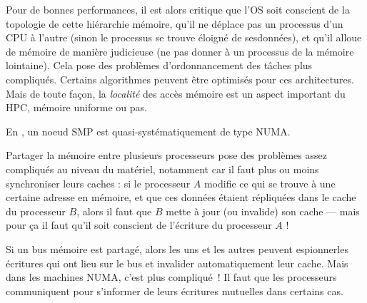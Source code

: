 Pour de bonnes performances, il est alors critique que l'OS soit conscient de la
topologie de cette hiérarchie mémoire, qu'il ne déplace pas un processus d'un
CPU à l'autre (sinon le processus se trouve éloigné de \og ses\fg données), et
qu'il alloue de mémoire de manière judicieuse (ne pas donner à un processus de
la mémoire \og lointaine\fg). Cela pose des problèmes d'ordonnancement des
tâches plus compliqués. Certains algorithmes peuvent être optimisés pour ces
architectures. Mais de toute façon, la \emph{localité} des accès mémoire est un
aspect important du HPC, mémoire uniforme ou pas.

En \the\year, un noeud SMP est quasi-systématiquement de type NUMA.

\begin{danger}
  Partager la mémoire entre plusieurs processeurs pose des problèmes assez
  compliqués au niveau du matériel, notamment car il faut plus ou moins
  synchroniser leurs caches : si le processeur $A$ modifie ce qui se trouve à
  une certaine adresse en mémoire, et que ces données étaient répliquées dans le
  cache du processeur $B$, alors il faut que $B$ mette à jour (ou invalide) son
  cache --- mais pour ça il faut qu'il soit conscient de l'écriture du
  processeur $A$ !

  Si un bus mémoire est partagé, alors les uns et les autres peuvent \og
  espionner\fg les écritures qui ont lieu sur le bus et invalider
  automatiquement leur cache. Mais dans les machines NUMA, c'est plus
  compliqué~! Il faut que les processeurs communiquent pour s'informer de leurs
  écritures mutuelles dans certains cas.
\end{danger}

